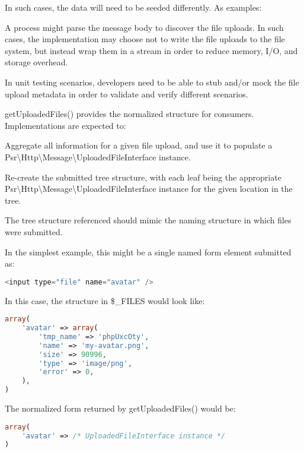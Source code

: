 In such cases, the data will need to be seeded differently. As examples:

\begin{compactitem}
\item A process might parse the message body to discover the file uploads. In such cases, the implementation may choose not to write the file uploads to the file system, but instead wrap them in a stream in order to reduce memory, I/O, and storage overhead.
\item In unit testing scenarios, developers need to be able to stub and/or mock the file upload metadata in order to validate and verify different scenarios.
\end{compactitem}

getUploadedFiles() provides the normalized structure for consumers. Implementations are expected to:

\begin{compactitem}
\item Aggregate all information for a given file upload, and use it to populate a Psr\textbackslash Http\textbackslash Message\textbackslash UploadedFileInterface instance.
\item Re-create the submitted tree structure, with each leaf being the appropriate Psr\textbackslash Http\textbackslash Message\textbackslash UploadedFileInterface instance for the given location in the tree.
\end{compactitem}

The tree structure referenced should mimic the naming structure in which files were submitted.

In the simplest example, this might be a single named form element submitted as:

\begin{lstlisting}[language=PHP]
<input type="file" name="avatar" />
\end{lstlisting}

In this case, the structure in \$\_FILES would look like:

\begin{lstlisting}[language=PHP]
array(
    'avatar' => array(
        'tmp_name' => 'phpUxcOty',
        'name' => 'my-avatar.png',
        'size' => 90996,
        'type' => 'image/png',
        'error' => 0,
    ),
)
\end{lstlisting}


The normalized form returned by getUploadedFiles() would be:



\begin{lstlisting}[language=PHP]
array(
    'avatar' => /* UploadedFileInterface instance */
)

\end{lstlisting}

